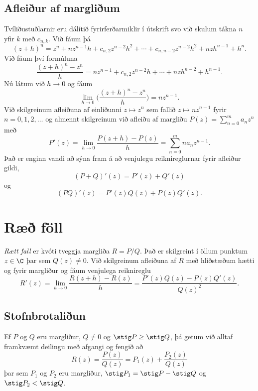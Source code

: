 \subsection*{Afleiður af margliðum}

Tvíliðustuðlarnir eru dálítið fyrirferðarmiklir í útskrift svo við
skulum tákna $n$ yfir $k$ með $c_{n,k}$.  Við fáum þá 
$$
(z+h)^n=z^n+nz^{n-1}h+c_{n,2}z^{n-2}h^2+\cdots+c_{n,n-2}z^{n-2}h^2+nzh^{n-1}+h^n.
$$
Við fáum því formúluna
$$
\dfrac{(z+h)^n-z^n}h=nz^{n-1}+c_{n,2}z^{n-2}h+\cdots+nzh^{n-2}+h^{n-1}.
$$
Nú látum við $h\to 0$ og fáum
$$\lim_{h\to 0}\bigg(
\dfrac{(z+h)^n-z^n}h\bigg)=nz^{n-1}.
$$
Við skilgreinum afleiðuna af einliðunni $z\mapsto z^n$ sem fallið
$z\mapsto nz^{n-1}$ fyrir $n=0,1,2,\dots$ og almennt skilgreinum við 
afleiðu af margliðu $P(z)=\sum_{n=0}^ma_nz^n$ með
$$
P'(z)=\lim_{h\to 0}\dfrac{P(z+h)-P(z)}h=\sum_{n=0}^mna_nz^{n-1}.
$$
Það er enginn vandi  að sýna fram á að venjulegu reiknireglurnar
 fyrir afleiður gildi,
$$
(P+Q)'(z)=P'(z)+Q'(z)
$$
og 
$$ 
(PQ)'(z)=P'(z)Q(z)+P(z)Q'(z).
$$

\section{Ræð föll}

{\it Rætt fall} er kvóti tveggja margliða $R=P/Q$. Það er
skilgreint í öllum punktum $z\in \C$  þar sem $Q(z)\neq 0$.
Við skilgreinum afleiðuna af $R$ með hliðstæðum hætti og fyrir
margliður og fáum venjulega reiknireglu
$$
R'(z)=\lim_{h\to
0}\dfrac{R(z+h)-R(z)}h=\dfrac{P'(z)Q(z)-P(z)Q'(z)}{Q(z)^2}.
$$


\subsection*{Stofnbrotaliðun}

\noindent
Ef $P$ og $Q$ eru margliður, $Q\neq 0$ og $\stig P\geq \stig Q$, 
þá getum við alltaf
framkvæmt deilingu með afgangi og fengið að
$$
R(z)=\dfrac {P(z)}{Q(z)}=P_1(z)+\dfrac {P_2(z)}{Q(z)}
$$ 
þar sem $P_1$ og $P_2$ eru margliður,  $\stig P_1=\stig P-\stig Q$ 
og $\stig P_2<\stig Q$.  

